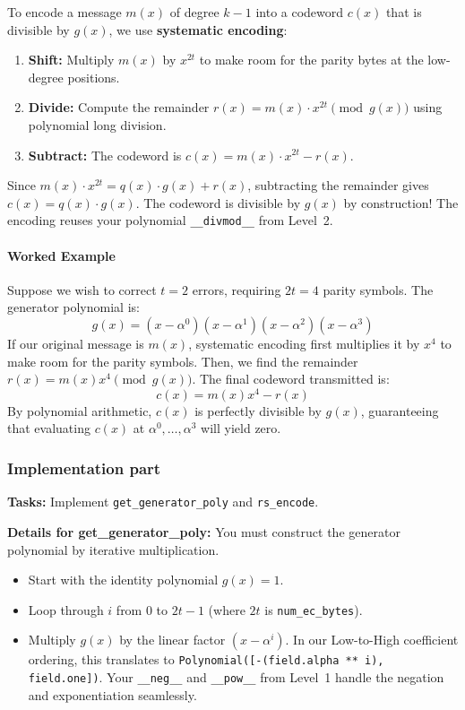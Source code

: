 To encode a message $m(x)$ of degree $k-1$ into a codeword $c(x)$ that is divisible by $g(x)$, we use \textbf{systematic encoding}:
\begin{enumerate}
    \item \textbf{Shift:} Multiply $m(x)$ by $x^{2t}$ to make room for the parity bytes at the low-degree positions.
    \item \textbf{Divide:} Compute the remainder $r(x) = m(x) \cdot x^{2t} \pmod{g(x)}$ using polynomial long division.
    \item \textbf{Subtract:} The codeword is $c(x) = m(x) \cdot x^{2t} - r(x)$.
\end{enumerate}
Since $m(x) \cdot x^{2t} = q(x) \cdot g(x) + r(x)$, subtracting the remainder gives $c(x) = q(x) \cdot g(x)$. The codeword is divisible by $g(x)$ by construction! The encoding reuses your polynomial \lstinline|__divmod__| from Level~2.

\paragraph{Worked Example}
Suppose we wish to correct $t=2$ errors, requiring $2t = 4$ parity symbols. The generator polynomial is:
\[
g(x) = (x-\alpha^0)(x-\alpha^1)(x-\alpha^2)(x-\alpha^3)
\]
If our original message is $m(x)$, systematic encoding first multiplies it by $x^{4}$ to make room for the parity symbols. Then, we find the remainder $r(x) = m(x)x^4 \pmod{g(x)}$. The final codeword transmitted is:
\[
c(x) = m(x)x^4 - r(x)
\]
By polynomial arithmetic, $c(x)$ is perfectly divisible by $g(x)$, guaranteeing that evaluating $c(x)$ at $\alpha^0, \dots, \alpha^3$ will yield zero.

\subsubsection*{Implementation part}
\textbf{Tasks:} Implement \lstinline|get_generator_poly| and \lstinline|rs_encode|.

\textbf{Details for get\_generator\_poly:} 
You must construct the generator polynomial by iterative multiplication.
\begin{itemize}
    \item Start with the identity polynomial $g(x) = 1$.
    \item Loop through $i$ from $0$ to $2t-1$ (where $2t$ is \lstinline|num_ec_bytes|).
    \item Multiply $g(x)$ by the linear factor $(x - \alpha^i)$. In our Low-to-High coefficient ordering, this translates to \lstinline|Polynomial([-(field.alpha ** i), field.one])|. Your \lstinline|__neg__| and \lstinline|__pow__| from Level~1 handle the negation and exponentiation seamlessly.
\end{itemize}

